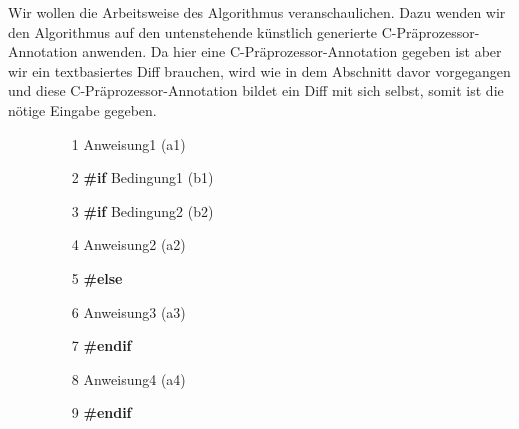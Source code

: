 Wir wollen die Arbeitsweise des Algorithmus veranschaulichen. Dazu wenden wir den Algorithmus auf den untenstehende künstlich generierte C-Präprozessor-Annotation anwenden. Da hier eine C-Präprozessor-Annotation gegeben ist aber wir ein textbasiertes Diff brauchen, wird wie in dem Abschnitt davor vorgegangen und diese C-Präprozessor-Annotation bildet ein Diff mit sich selbst, somit ist die nötige Eingabe gegeben.
\begin{figure}[h]
	\begin{itemize}
		\item[1 ] Anweisung1	(a1)
		\item[2 ] \textbf{\#if} Bedingung1 (b1)
		\item[3 ] \hspace*{0.5cm} \textbf{\#if} Bedingung2 (b2)
		\item[4 ] \hspace*{1cm}Anweisung2 (a2)
		\item[5 ] \hspace*{0.5cm}\textbf{\#else}
		\item[6 ] \hspace*{1cm}Anweisung3 (a3)
		\item[7 ] \hspace*{0.5cm}\textbf{\#endif}
		\item[8 ] \hspace*{0.5cm}Anweisung4 (a4)
		\item[9 ] \textbf{\#endif}
	\end{itemize}
\end{figure}

